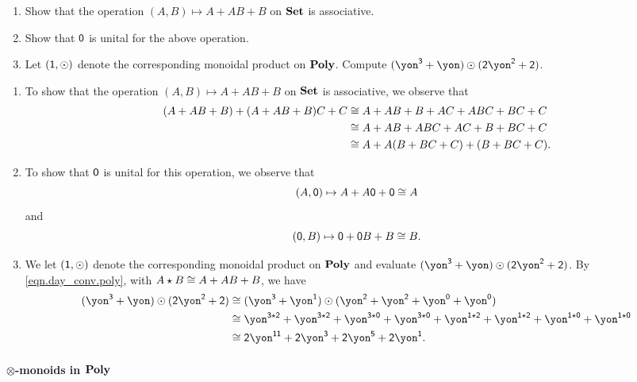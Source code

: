 \documentclass[Book-Poly]{subfiles}
\begin{document}
\begin{exercise}
\begin{enumerate}
	\item Show that the operation $(A, B)\mapsto A+AB+B$ on $\mathbf{Set}$ is associative.
	\item Show that $\textsf{0}$ is unital for the above operation.
	\item Let $(\textsf{1},\odot)$ denote the corresponding monoidal product on $\mathbf{Poly}$. Compute $(\yon^\3+\yon)\odot(\2\yon^\2+\2)$.
\qedhere
\end{enumerate}
\begin{solution}
\begin{enumerate}
    \item To show that the operation $(A, B)\mapsto A+AB+B$ on $\mathbf{Set}$ is associative, we observe that
    \begin{align*}
        (A + AB + B) + (A + AB + B)C + C &\cong A + AB + B + AC + ABC + BC + C \\
        &\cong A + AB + ABC + AC + B + BC + C \\
        &\cong A + A(B + BC + C) + (B + BC + C).
    \end{align*}
    \item To show that $\textsf{0}$ is unital for this operation, we observe that
    \[
        (A, \textsf{0}) \mapsto A + A\textsf{0} + \textsf{0} \cong A
    \]
    and
    \[
        (\textsf{0}, B) \mapsto \textsf{0} + \textsf{0}B + B \cong B.
    \]
    \item We let $(\textsf{1},\odot)$ denote the corresponding monoidal product on $\mathbf{Poly}$ and evaluate $(\yon^\3+\yon)\odot(\2\yon^\2+\2)$.
    By \eqref{eqn.day_conv.poly}, with $A \star B \cong A + AB + B$, we have
    \begin{align*}
        (\yon^\3+\yon)\odot(\2\yon^\2+\2) &\iso (\yon^\3+\yon^\1)\odot(\yon^\2+\yon^\2+\yon^\0+\yon^\0) \\
        &\iso \yon^{\3\star\2} + \yon^{\3\star\2} + \yon^{\3\star\0} + \yon^{\3\star\0} + \yon^{\1\star\2} + \yon^{\1\star\2} + \yon^{\1\star\0} + \yon^{\1\star\0} \\
        &\iso \2\yon^{\1\1} + \2\yon^\3 + \2\yon^\5 + \2\yon^\1.
    \end{align*}
\end{enumerate}
\end{solution}
\end{exercise}

\paragraph{$\otimes$-monoids in $\mathbf{Poly}$}
\end{document}
